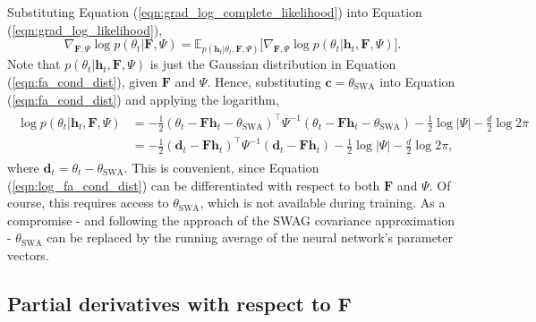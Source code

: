 \documentclass[msc,deptreport.inf]{infthesis} %
\newcommand{\matr}[1]{\mathbf{#1}}
\newcommand{\E}{\mathbb E}
\begin{document}
Substituting Equation (\ref{eqn:grad_log_complete_likelihood}) into Equation (\ref{eqn:grad_log_likelihood}),
\begin{equation}\label{eqn:simplified_grad_log_likelihood}
	\nabla_{\matr{F}, \Psi} \log p(\theta_t | \matr{F}, \Psi)
	= \E_{p(\matr{h}_t | \theta_t, \matr{F}, \Psi)} \big[ \nabla_{\matr{F}, \Psi} \log p(\theta_t | \matr{h}_t, \matr{F}, \Psi) \big].
\end{equation}
Note that $p(\theta_t | \matr{h}_t, \matr{F}, \Psi)$ is just the Gaussian distribution in Equation (\ref{eqn:fa_cond_dist}), given $\matr{F}$ and $\Psi$. Hence, substituting $\matr{c} = \theta_{\text{SWA}}$ into Equation (\ref{eqn:fa_cond_dist}) and applying the logarithm,
\begin{align}\label{eqn:log_fa_cond_dist}
\begin{split}
	\log p(\theta_t | \matr{h}_t, \matr{F}, \Psi)
	& = -\frac{1}{2} (\theta_t - \matr{Fh}_t - \theta_{\text{SWA}})^\intercal \Psi^{-1} (\theta_t - \matr{Fh}_t - \theta_{\text{SWA}}) - \frac{1}{2} \log |\Psi| - \frac{d}{2} \log 2\pi \\
	& = -\frac{1}{2} (\matr{d}_t - \matr{Fh}_t)^\intercal \Psi^{-1} (\matr{d}_t - \matr{Fh}_t) - \frac{1}{2} \log |\Psi| - \frac{d}{2} \log 2\pi,
\end{split}
\end{align}
where $\matr{d}_t = \theta_t - \theta_{\text{SWA}}$. This is convenient, since Equation (\ref{eqn:log_fa_cond_dist}) can be differentiated with respect to both $\matr{F}$ and $\Psi$. Of course, this requires access to $\theta_{\text{SWA}}$, which is not available during training. As a compromise - and following the approach of the SWAG covariance approximation - $\theta_{\text{SWA}}$ can be replaced by the running average of the neural network's parameter vectors.

\subsection{Partial derivatives with respect to $\matr{F}$}
\end{document}
